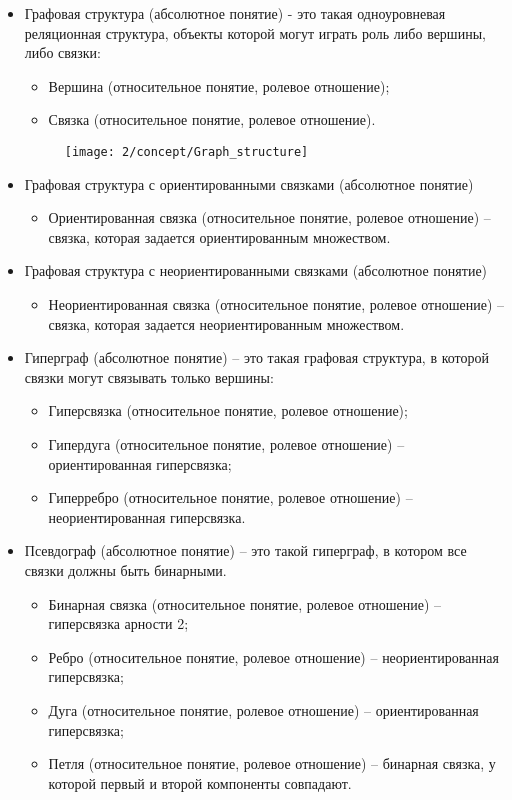\begin{itemize}
\item Графовая структура (абсолютное понятие) - это такая
  одноуровневая реляционная структура, объекты которой могут играть
  роль либо вершины, либо связки:
  \begin{itemize}
  \item Вершина (относительное понятие, ролевое отношение);
  \item Связка (относительное понятие, ролевое отношение).
  \end{itemize}

  \begin{figure}[h!]
    \centering
    \texttt{[image: 2/concept/Graph\_structure]}
    \label{fig:Concept_Graph_structure}
  \end{figure}


\item Графовая структура с ориентированными связками (абсолютное
  понятие)
  \begin{itemize}
  \item Ориентированная связка (относительное понятие, ролевое
    отношение) – связка, которая задается ориентированным множеством.
  \end{itemize}

\item Графовая структура с неориентированными связками (абсолютное
  понятие)
  \begin{itemize}
  \item Неориентированная связка (относительное понятие, ролевое
    отношение) – связка, которая задается неориентированным
    множеством.
  \end{itemize}

\item Гиперграф (абсолютное понятие) – это такая графовая структура, в
  которой связки могут связывать только вершины:
  \begin{itemize}
  \item Гиперсвязка (относительное понятие, ролевое отношение);
  \item Гипердуга (относительное понятие, ролевое отношение) –
    ориентированная гиперсвязка;
  \item Гиперребро (относительное понятие, ролевое отношение) –
    неориентированная гиперсвязка.
  \end{itemize}

\item Псевдограф (абсолютное понятие) – это такой гиперграф, в котором
  все связки должны быть бинарными.
  \begin{itemize}
  \item Бинарная связка (относительное понятие, ролевое отношение)
    – гиперсвязка арности 2; 
  \item Ребро (относительное понятие, ролевое
    отношение) – неориентированная гиперсвязка;
  \item Дуга (относительное понятие, ролевое отношение) –
    ориентированная гиперсвязка;
  \item Петля (относительное понятие, ролевое отношение) – бинарная
    связка, у которой первый и второй компоненты совпадают.
  \end{itemize}


\end{itemize}
